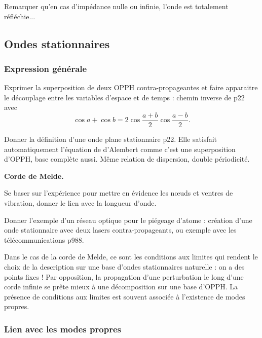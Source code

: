 \begin{transition}
Remarquer qu'en cas d'impédance nulle ou infinie, l'onde est totalement réfléchie...
\end{transition}

\subsection{Ondes stationnaires}

\subsubsection{Expression générale}

Exprimer la superposition de deux OPPH contra-propageantes et faire apparaitre le découplage entre les variables d'espace et de temps : chemin inverse de \cite{Thibierge2014} p22 avec
\begin{equation}
\cos a + \cos b = 2\cos\frac{a+b}{2}\cos\frac{a-b}{2}.
\end{equation}

Donner la définition d'une onde plane stationnaire \cite{Thibierge2014} p22.
Elle satisfait automatiquement l'équation de d'Alembert comme c'est une superposition d'OPPH, base complète aussi.
Même relation de dispersion, double périodicité.

\begin{experience}
\textbf{Corde de Melde.}
\end{experience}
Se baser sur l'expérience pour mettre en évidence les nœuds et ventres de vibration, donner le lien avec la longueur d'onde.

Donner l'exemple d'un réseau optique pour le piégeage d'atome : création d'une onde stationnaire avec deux lasers contra-propageants, ou exemple avec les télécommunications \cite{Sanz2016} p988.

\begin{transition}
Dans le cas de la corde de Melde, ce sont les conditions aux limites qui rendent le choix de la description sur une base d'ondes stationnaires naturelle : on a des points fixes !
Par opposition, la propagation d'une perturbation le long d'une corde infinie se prête mieux à une décomposition sur une base d'OPPH.
La présence de conditions aux limites est souvent associée à l'existence de modes propres.
\end{transition}

\subsubsection{Lien avec les modes propres}

